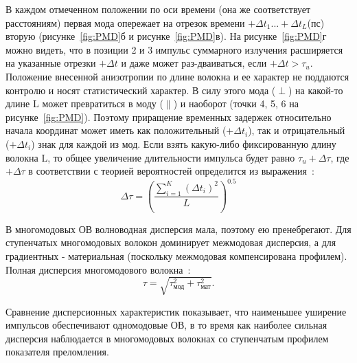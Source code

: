 \documentclass[14pt,a4paper]{extarticle}
\numberwithin{equation}{section}
\numberwithin{figure}{section}
\numberwithin{table}{section}
\begin{document}
В каждом отмеченном положении по оси времени (она же соответствует расстояниям) первая мода опережает на отрезок времени $+\Delta t_1...+\Delta t_L$(пс) вторую (рисунке~\ref{fig:PMD}б и рисунке~\ref{fig:PMD}в). На рисунке~\ref{fig:PMD}г можно видеть, что в позиции 2 и 3 импульс суммарного излучения расширяется на указанные отрезки $+\Delta t$ и даже может раз-дваиваться, если $+\Delta t > \tau_u$. Положение внесенной анизотропии по длине волокна и ее характер не поддаются контролю и носят статистический характер. В силу этого мода ($\perp$) на какой-то длине L может превратиться в моду ($\parallel$) и наоборот (точки 4, 5, 6 на рисунке~\ref{fig:PMD}). Поэтому приращение временных задержек относительно начала координат может иметь как положительный ($+\Delta t_i$), так и отрицательный ($+\Delta t_i$) знак для каждой из мод. Если взять какую-либо фиксированную длину волокна L, то общее увеличение длительности импульса будет равно $\tau_u +\Delta \tau$, где $+\Delta \tau$ в соответствии с теорией вероятностей определится из выражения~\cite{sklyarov2016}:
\begin{equation}
   \Delta \tau = (\frac{\sum_{i=1}^K (\Delta t_i)^2}{L})^{0.5}
\end{equation}



В многомодовых ОВ волноводная дисперсия мала, поэтому ею пренебрегают. Для ступенчатых многомодовых волокон доминирует межмодовая дисперсия, а для градиентных - материальная (поскольку межмодовая компенсирована профилем). Полная дисперсия многомодового волокна~\cite{volokonno2012}:
\begin{equation}
    \tau = \sqrt{\tau_\text{мод}^2 + \tau_\text{мат}^2}.
\end{equation}

Сравнение дисперсионных характеристик показывает, что наименьшее уширение импульсов обеспечивают одномодовые ОВ, в то время как наиболее сильная дисперсия наблюдается в многомодовых волокнах со ступенчатым профилем показателя преломления.












\newpage
\end{document}
